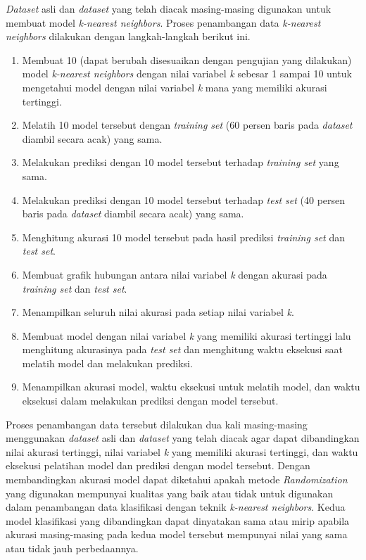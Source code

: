\textit{Dataset} asli dan \textit{dataset} yang telah diacak masing-masing digunakan untuk membuat model \textit{k-nearest neighbors}. Proses penambangan data \textit{k-nearest neighbors} dilakukan dengan langkah-langkah berikut ini.
\begin{enumerate}
    \item Membuat 10 (dapat berubah disesuaikan dengan pengujian yang dilakukan) model \textit{k-nearest neighbors} dengan nilai variabel \textit{k} sebesar 1 sampai 10 untuk mengetahui model dengan nilai variabel \textit{k} mana yang memiliki akurasi tertinggi.
    \item Melatih 10 model tersebut dengan \textit{training set} (60 persen baris pada \textit{dataset} diambil secara acak) yang sama.
    \item Melakukan prediksi dengan 10 model tersebut terhadap \textit{training set} yang sama.
    \item Melakukan prediksi dengan 10 model tersebut terhadap \textit{test set} (40 persen baris pada \textit{dataset} diambil secara acak) yang sama.
    \item Menghitung akurasi 10 model tersebut pada hasil prediksi \textit{training set} dan \textit{test set}.
    \item Membuat grafik hubungan antara nilai variabel \textit{k} dengan akurasi pada \textit{training set} dan \textit{test set}.
    \item Menampilkan seluruh nilai akurasi pada setiap nilai variabel \textit{k}.
    \item Membuat model dengan nilai variabel \textit{k} yang memiliki akurasi tertinggi lalu menghitung akurasinya pada \textit{test set} dan menghitung waktu eksekusi saat melatih model dan melakukan prediksi.
    \item Menampilkan akurasi model, waktu eksekusi untuk melatih model, dan waktu eksekusi dalam melakukan prediksi dengan model tersebut.
\end{enumerate}
Proses penambangan data tersebut dilakukan dua kali masing-masing menggunakan \textit{dataset} asli dan \textit{dataset} yang telah diacak agar dapat dibandingkan nilai akurasi tertinggi, nilai variabel \textit{k} yang memiliki akurasi tertinggi, dan waktu eksekusi pelatihan model dan prediksi dengan model tersebut. Dengan membandingkan akurasi model dapat diketahui apakah metode \textit{Randomization} yang digunakan mempunyai kualitas yang baik atau tidak untuk digunakan dalam penambangan data klasifikasi dengan teknik \textit{k-nearest neighbors}. Kedua model klasifikasi yang dibandingkan dapat dinyatakan sama atau mirip apabila akurasi masing-masing pada kedua model tersebut mempunyai nilai yang sama atau tidak jauh perbedaannya.

